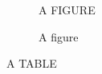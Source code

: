 \documentclass{article}
\begin{document}
\makeatletter
\show\captionseparator
\show\captionfont
\show\captionfont@default
\show\@makecaption
\makeatother

\begin{figure}
\centering A FIGURE
\caption{A figure}
\end{figure}

\begin{table}
\centering A TABLE
\caption{A table}
\end{table}
\end{document}
